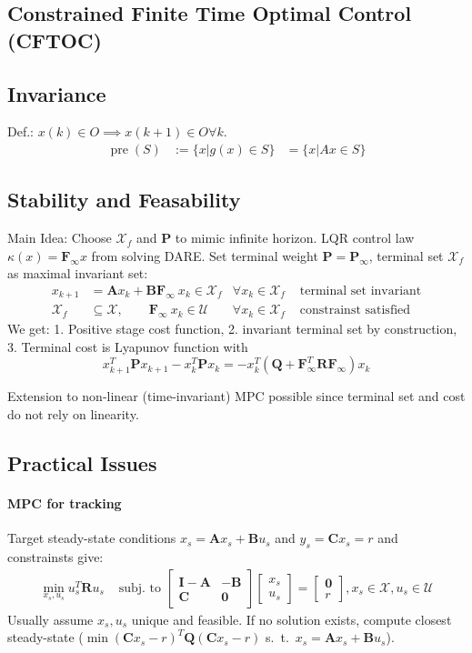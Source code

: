 \documentclass[landscape,a4paper,8pt]{scrartcl}
\newcommand{\mc}[1]{\mathcal{#1}}
\newcommand\vA{\bm{A}}
\newcommand\vB{\bm{B}}
\newcommand\vC{\bm{C}}
\newcommand\vF{\bm{F}}
\newcommand\vI{\bm{I}}
\newcommand\vP{\bm{P}}
\newcommand\vQ{\bm{Q}}
\newcommand\vR{\bm{R}}
\newcommand{\Me}[1]{\begin{bmatrix}#1\end{bmatrix}} %
\DeclareMathOperator\pre{pre}
\begin{document}
\begin{multicols*}{3}
\subsection{Constrained Finite Time Optimal Control (CFTOC)}

\subsection{Invariance}
Def.: $x(k) \in O \implies x(k+1) \in O \forall k$. \\
\begin{align*}
\pre(S) & := \{ x | g(x) \in S\} & = \{ x | Ax \in S \}
\end{align*}


\subsection{Stability and Feasability}

Main Idea: Choose $\mc X_f$ and $\vP$ to mimic infinite horizon.
LQR control law $\kappa(x) = \vF_\infty x$ from solving DARE.
Set terminal weight $\vP = \vP_\infty$, terminal set $\mc X_f$ as maximal invariant set:
\begin{align*}
x_{k+1} & = \vA x_k + \vB\vF_\infty\ x_k \in \mc X_f & \forall x_k \in \mc X_f & \text{ terminal set invariant} \\
\mc X_f & \subseteq \mc X, \qquad \vF_\infty\ x_k \in \mc U & \forall x_k \in \mc X_f & \text{ constrainst satisfied}
\end{align*}
We get: 1. Positive stage cost function, 2. invariant terminal set by construction, 3. Terminal cost is Lyapunov function with
\[ x_{k+1}^T\vP x_{k+1} - x_k^T\vP x_k = -x_k^T(\vQ + \vF_\infty^T\vR\vF_\infty)x_k \]

Extension to non-linear (time-invariant) MPC possible since terminal set and cost do not rely on linearity.

\subsection{Practical Issues}

\paragraph{MPC for tracking}
Target steady-state conditions $x_s = \vA x_s + \vB u_s$ and $y_s = \vC x_s = r$ and constrainsts give:
\begin{align*}
\min_{x_s, u_s} u_s^T \vR u_s & \text{ subj. to } \Me{\vI-\vA & -\vB \\ \vC & \bm 0}\Me{x_s \\ u_s} = \Me{\bm 0 \\ r}, x_s \in \mc X, u_s \in \mc U
\end{align*}
Usually assume $x_s, u_s$ unique and feasible.
If no solution exists, compute closest steady-state ($\min (\vC x_s - r)^T \vQ (\vC x_s - r)$ s.\ t.\ $x_s = \vA x_s + \vB u_s$).



\end{multicols*}
\end{document}
